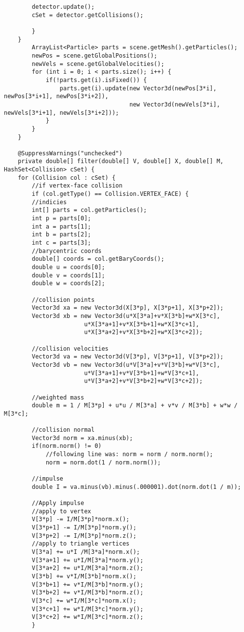 \begin{lstlisting}
		detector.update();
		cSet = detector.getCollisions();

	    }
	}	
		ArrayList<Particle> parts = scene.getMesh().getParticles();
		newPos = scene.getGlobalPositions();
		newVels = scene.getGlobalVelocities();
		for (int i = 0; i < parts.size(); i++) {
			if(!parts.get(i).isFixed()) {
				parts.get(i).update(new Vector3d(newPos[3*i], newPos[3*i+1], newPos[3*i+2]), 
									new Vector3d(newVels[3*i], newVels[3*i+1], newVels[3*i+2]));
			}
		}
    }

    @SuppressWarnings("unchecked")
    private double[] filter(double[] V, double[] X, double[] M, HashSet<Collision> cSet) {
	for (Collision col : cSet) {
	    //if vertex-face collision
	    if (col.getType() == Collision.VERTEX_FACE) {
		//indicies
		int[] parts = col.getParticles();
		int p = parts[0];
		int a = parts[1];
		int b = parts[2];
		int c = parts[3];
		//barycentric coords
		double[] coords = col.getBaryCoords();
		double u = coords[0];
		double v = coords[1];
		double w = coords[2];

		//collision points
		Vector3d xa = new Vector3d(X[3*p], X[3*p+1], X[3*p+2]);
		Vector3d xb = new Vector3d(u*X[3*a]+v*X[3*b]+w*X[3*c],
					   u*X[3*a+1]+v*X[3*b+1]+w*X[3*c+1],
					   u*X[3*a+2]+v*X[3*b+2]+w*X[3*c+2]);

		//collision velocities
		Vector3d va = new Vector3d(V[3*p], V[3*p+1], V[3*p+2]);
		Vector3d vb = new Vector3d(u*V[3*a]+v*V[3*b]+w*V[3*c],
					   u*V[3*a+1]+v*V[3*b+1]+w*V[3*c+1],
					   u*V[3*a+2]+v*V[3*b+2]+w*V[3*c+2]);
		
		//weighted mass
		double m = 1 / M[3*p] + u*u / M[3*a] + v*v / M[3*b] + w*w / M[3*c];

		//collision normal
		Vector3d norm = xa.minus(xb);
		if(norm.norm() != 0)
		    //following line was: norm = norm / norm.norm();
		    norm = norm.dot(1 / norm.norm());

		//impulse	       
		double I = va.minus(vb).minus(.000001).dot(norm.dot(1 / m));
		
		//Apply impulse
		//apply to vertex
		V[3*p] -= I/M[3*p]*norm.x();
		V[3*p+1] -= I/M[3*p]*norm.y();
		V[3*p+2] -= I/M[3*p]*norm.z();
		//apply to triangle vertices
		V[3*a] += u*I /M[3*a]*norm.x();
		V[3*a+1] += u*I/M[3*a]*norm.y();
		V[3*a+2] += u*I/M[3*a]*norm.z();
		V[3*b] += v*I/M[3*b]*norm.x();
		V[3*b+1] += v*I/M[3*b]*norm.y();
		V[3*b+2] += v*I/M[3*b]*norm.z();
		V[3*c] += w*I/M[3*c]*norm.x();
		V[3*c+1] += w*I/M[3*c]*norm.y();
		V[3*c+2] += w*I/M[3*c]*norm.z();
	    }


\end{lstlisting}
